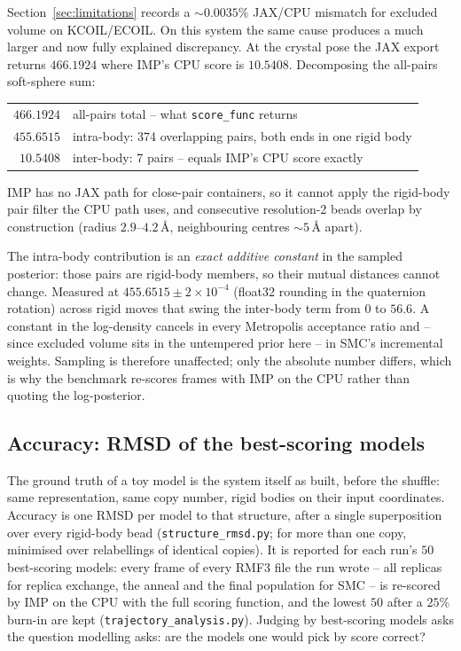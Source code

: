 \documentclass[11pt]{article}
\begin{document}
Section~\ref{sec:limitations} records a ${\sim}0.0035\%$ JAX/CPU mismatch for
excluded volume on KCOIL/ECOIL. On this system the same cause produces a much
larger and now fully explained discrepancy. At the crystal pose the JAX export
returns $466.1924$ where IMP's CPU score is $10.5408$. Decomposing the
all-pairs soft-sphere sum:
%
\begin{center}
\begin{tabular}{@{}r l@{}}
\toprule
$466.1924$ & all-pairs total -- what \texttt{score\_func} returns \\
$455.6515$ & intra-body: 374 overlapping pairs, both ends in one rigid body \\
$10.5408$  & inter-body: 7 pairs -- equals IMP's CPU score exactly \\
\bottomrule
\end{tabular}
\end{center}
%
IMP has no JAX path for close-pair containers, so it cannot apply the
rigid-body pair filter the CPU path uses, and consecutive resolution-2 beads
overlap by construction (radius $2.9$--$4.2$\,\AA, neighbouring centres
${\sim}5$\,\AA{} apart).

The intra-body contribution is an \emph{exact additive constant} in the
sampled posterior: those pairs are rigid-body members, so their mutual
distances cannot change. Measured at $455.6515 \pm 2\times10^{-4}$ (float32
rounding in the quaternion rotation) across rigid moves that swing the
inter-body term from $0$ to $56.6$. A constant in the log-density cancels in
every Metropolis acceptance ratio and -- since excluded volume sits in the
untempered prior here -- in SMC's incremental weights. Sampling is therefore
unaffected; only the absolute number differs, which is why the benchmark
re-scores frames with IMP on the CPU rather than quoting the log-posterior.

\subsection{Accuracy: RMSD of the best-scoring models}

The ground truth of a toy model is the system itself as built, before the
shuffle: same representation, same copy number, rigid bodies on their input
coordinates. Accuracy is one RMSD per model to that structure, after a single
superposition over every rigid-body bead (\texttt{structure\_rmsd.py}; for
more than one copy, minimised over relabellings of identical copies). It is
reported for each run's $50$ best-scoring models: every frame of every RMF3
file the run wrote -- all replicas for replica exchange, the anneal and the
final population for SMC -- is re-scored by IMP on the CPU with the full
scoring function, and the lowest $50$ after a $25\%$ burn-in are kept
(\texttt{trajectory\_analysis.py}). Judging by best-scoring models asks the
question modelling asks: are the models one would pick by score correct?
\end{document}
